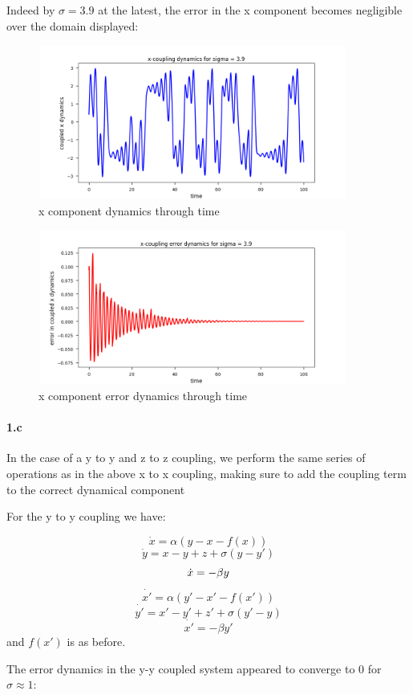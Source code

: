 \documentclass{article}
\begin{document}
Indeed by $\sigma = 3.9$ at the latest, the error in the x component becomes negligible over the domain displayed:

\begin{figure}[H]
\centering
\includegraphics[width = 4in, height = 2in]{x_coupling_x_dynamics_s39.png}
\caption{x component dynamics through time}
\end{figure}

\begin{figure}[H]
\centering
\includegraphics[width = 4in, height = 2in]{x_coupling_x_errors_s39.png}
\caption{x component error dynamics through time}
\end{figure}


\paragraph{1.c} In the case of a y to y and z to z coupling, we perform the same series of operations
as in the above x to x coupling, making sure to add the coupling term to the correct dynamical component

For the y to y coupling we have:

$$\dot{x} = \alpha(y - x - f(x)) $$
$$\dot{y} = x - y + z + \sigma(y - y')$$
$$\dot{x} = -\beta y\newline$$
$$\dot{x'} = \alpha(y' - x' - f(x'))$$
$$\dot{y'} = x' - y' + z' + \sigma(y' - y)$$
$$\dot{x'} = -\beta y'$$
and $f(x')$ is as before.

The error dynamics in the y-y coupled system appeared to converge to 0 for $\sigma \approx 1$:
\end{document}
